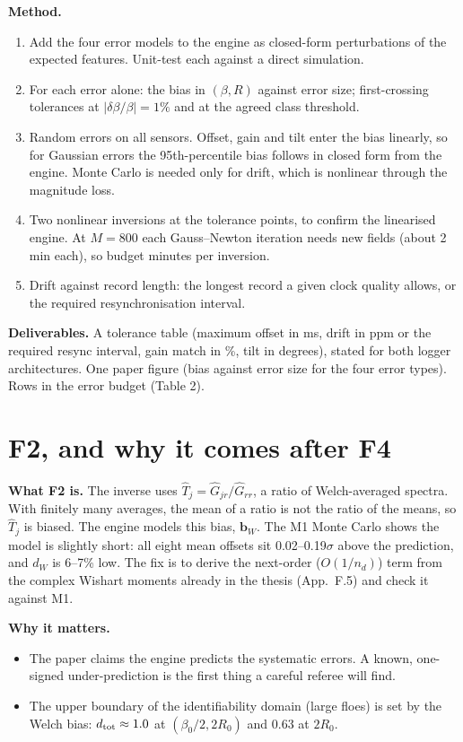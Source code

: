 \documentclass[10pt,a4paper]{article}
\begin{document}
\textbf{Method.}
\begin{enumerate}
\item Add the four error models to the engine as closed-form perturbations of the expected features. Unit-test each against a direct simulation.
\item For each error alone: the bias in $(\beta,R)$ against error size; first-crossing tolerances at $|\delta\beta/\beta|=1\%$ and at the agreed class threshold.
\item Random errors on all sensors. Offset, gain and tilt enter the bias linearly, so for Gaussian errors the 95th-percentile bias follows in closed form from the engine. Monte Carlo is needed only for drift, which is nonlinear through the magnitude loss.
\item Two nonlinear inversions at the tolerance points, to confirm the linearised engine. At $M=800$ each Gauss--Newton iteration needs new fields (about 2\,min each), so budget minutes per inversion.
\item Drift against record length: the longest record a given clock quality allows, or the required resynchronisation interval.
\end{enumerate}

\textbf{Deliverables.} A tolerance table (maximum offset in ms, drift in ppm or the required resync interval, gain match in \%, tilt in degrees), stated for both logger architectures. One paper figure (bias against error size for the four error types). Rows in the error budget (Table 2).

\section{F2, and why it comes after F4}\label{sec:f2}
\textbf{What F2 is.} The inverse uses $\hat T_j=\hat G_{jr}/\hat G_{rr}$, a ratio of Welch-averaged spectra. With finitely many averages, the mean of a ratio is not the ratio of the means, so $\hat T_j$ is biased. The engine models this bias, $\mathbf b_W$. The M1 Monte Carlo shows the model is slightly short: all eight mean offsets sit 0.02--0.19$\sigma$ above the prediction, and $d_W$ is 6--7\% low. The fix is to derive the next-order ($O(1/n_d)$) term from the complex Wishart moments already in the thesis (App.~F.5) and check it against M1.

\textbf{Why it matters.}
\begin{itemize}
\item The paper claims the engine predicts the systematic errors. A known, one-signed under-prediction is the first thing a careful referee will find.
\item The upper boundary of the identifiability domain (large floes) is set by the Welch bias: $d_{\rm tot}\approx1.0$ at $(\beta_0/2,2R_0)$ and 0.63 at $2R_0$.
\end{itemize}
\end{document}
